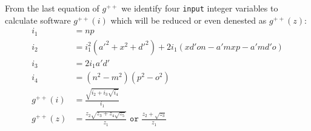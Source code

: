 \documentclass[11pt]{article}
\begin{document}
From the last equation of $g^{++}$ we identify four \texttt{input} integer variables to calculate software $g^{++}(i)$ which will be reduced or even denested as $g^{++}(z)$:
\begin{align}
i_1 &= np \\
i_2 &= i_1^2(a'^2 + x^2 + d'^2) + 2i_1(xd'on - a'mxp - a'md'o)\\
i_3 &= 2i_1a'd' \nonumber\\
i_4 &= (n^2 - m^2)(p^2 - o^2)\\
g^{++}(i) &= \frac{\sqrt{i_2 + i_3\sqrt{i_4}}}{i_1}\\
g^{++}(z) &= \frac{z_2\sqrt{z_3 + z_4\sqrt{z_5}}}{z_1}
 \texttt{ or } \frac{z_2 + \sqrt{z_3}}{z_1}
\end{align}



%
%
%
\end{document}
